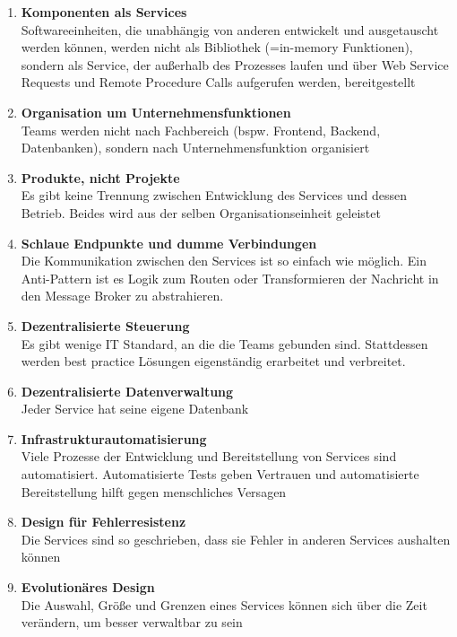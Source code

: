 \begin{enumerate}
      \item \textbf{Komponenten als Services}\label{components-as-service} \\
            Softwareeinheiten, die unabhängig von anderen entwickelt und
            ausgetauscht werden können, werden nicht als Bibliothek (=in-memory
            Funktionen), sondern als Service, der außerhalb des Prozesses laufen und
            über Web Service Requests und Remote Procedure Calls aufgerufen werden, bereitgestellt
      \item \textbf{Organisation um Unternehmensfunktionen}\label{organization-around-function} \\
            Teams werden nicht nach Fachbereich (bspw. Frontend, Backend,
            Datenbanken), sondern nach Unternehmensfunktion organisiert
      \item \textbf{Produkte, nicht Projekte} \\
            Es gibt keine Trennung zwischen Entwicklung des Services und dessen
            Betrieb. Beides wird aus der selben Organisationseinheit geleistet
      \item \textbf{Schlaue Endpunkte und dumme Verbindungen}\label{smart-endpoints-dump-pipes} \\
            Die Kommunikation zwischen den Services ist so einfach wie möglich. Ein
            Anti-Pattern ist es Logik zum Routen oder Transformieren der Nachricht
            in den Message Broker zu abstrahieren.
      \item \textbf{Dezentralisierte Steuerung} \\
            Es gibt wenige IT Standard, an die die Teams gebunden sind. Stattdessen
            werden best practice Lösungen eigenständig erarbeitet und verbreitet.
      \item \textbf{Dezentralisierte Datenverwaltung}\label{decentralized-data} \\
            Jeder Service hat seine eigene Datenbank
      \item \textbf{Infrastrukturautomatisierung}\label{automatisierung} \\
            Viele Prozesse der Entwicklung und Bereitstellung von Services sind
            automatisiert. Automatisierte Tests geben Vertrauen und automatisierte
            Bereitstellung hilft gegen menschliches Versagen
      \item \textbf{Design für Fehlerresistenz} \\
            Die Services sind so geschrieben, dass sie Fehler in anderen Services
            aushalten können
      \item \textbf{Evolutionäres Design} \\
            Die Auswahl, Größe und Grenzen eines Services können sich über die Zeit
            verändern, um besser verwaltbar zu sein
\end{enumerate}

